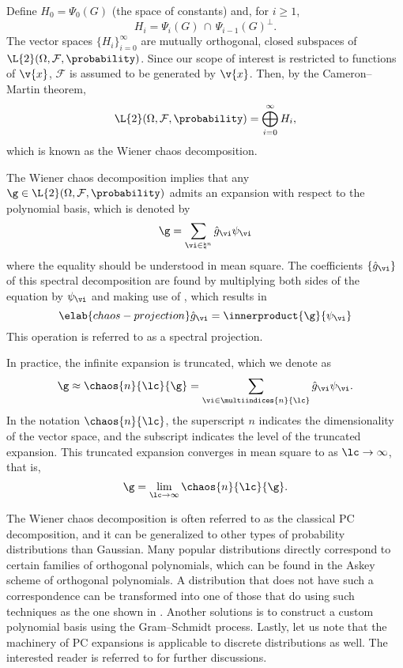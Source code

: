 Define $H_0 = \Psi_0(G)$ (the space of constants) and, for $i \geq 1$,
\[
  H_i = \Psi_i(G) \, \cap \, \Psi_{i - 1}(G)^\perp.
\]
The vector spaces $\{ H_i \}_{i = 0}^\infty$ are mutually orthogonal, closed
subspaces of $\L{2}(\Omega, \mathcal{F}, \probability)$. Since our scope of
interest is restricted to functions of $\v{x}$, $\mathcal{F}$ is assumed to be
generated by $\v{x}$. Then, by the Cameron--Martin theorem,
\[
  \L{2}(\Omega, \mathcal{F}, \probability) = \bigoplus_{i = 0}^\infty H_i,
\]
which is known as the Wiener chaos decomposition.

The Wiener chaos decomposition implies that any $\g \in \L{2}(\Omega,
\mathcal{F}, \probability)$ admits an expansion with respect to the polynomial
basis, which is denoted by
\[
  \g = \sum_{\vi \in \natural^n} \hat{g}_{\vi} \psi_{\vi}
\]
where the equality should be understood in mean square. The coefficients $\{
\hat{g}_{\vi} \}$ of this spectral decomposition are found by multiplying both
sides of the equation by $\psi_{\vi}$ and making use of
, which results in
\begin{equation} \elab{chaos-projection}
  \hat{g}_{\vi} = \innerproduct{\g}{\psi_{\vi}}
\end{equation}
This operation is referred to as a spectral projection.

In practice, the infinite expansion is truncated, which we denote as
\[
  \g \approx \chaos{n}{\lc}{\g} = \sum_{\vi \in \multiindices{n}{\lc}} \hat{g}_{\vi} \psi_{\vi}.
\]
In the notation $\chaos{n}{\lc}$, the superscript $n$ indicates the
dimensionality of the vector space, and the subscript \lc indicates the level of
the truncated expansion. This truncated expansion converges in mean square to \g
as $\lc \to \infty$, that is,
\[
  \g = \lim_{\lc \to \infty} \chaos{n}{\lc}{\g}.
\]

The Wiener chaos decomposition is often referred to as the classical \acf{PC}
decomposition, and it can be generalized to other types of probability
distributions than Gaussian. Many popular distributions directly correspond to
certain families of orthogonal polynomials, which can be found in the Askey
scheme of orthogonal polynomials. A distribution that does not have such a
correspondence can be transformed into one of those that do using such
techniques as the one shown in . Another
solutions is to construct a custom polynomial basis using the Gram--Schmidt
process. Lastly, let us note that the machinery of \ac{PC} expansions is
applicable to discrete distributions as well. The interested reader is referred
to \cite{xiu2010} for further discussions.

